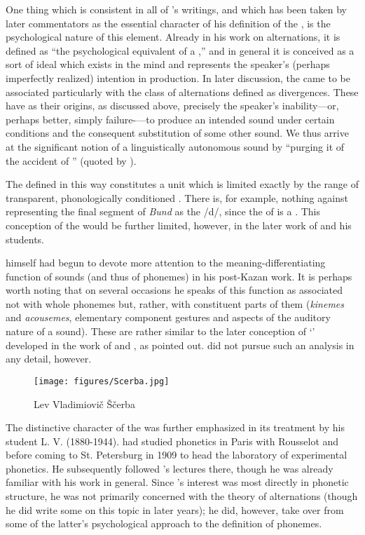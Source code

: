One thing which is consistent in all of {\Baudouin}'s writings, and which
has been taken by later commentators as the essential character of his
definition of the , is the psychological nature of this
element. Already in his work on alternations, it is defined as ``the
psychological equivalent of a ,'' and in general it is
conceived as a sort of ideal  which exists in the mind and
represents the speaker's (perhaps imperfectly realized) intention in
production. In later discussion, the  came to be associated
particularly with the class of alternations defined as
divergences. These have as their origins, as discussed above,
precisely the speaker's inability—or, perhaps better, simply
failure-—to produce an intended sound under certain conditions and the
consequent substitution of some other sound. We thus arrive at the
{significant} notion of a linguistically autonomous sound by ``purging it
of the accident of '' (quoted by
\citealt[25]{stankiewicz72:intro}).

The  defined in this way constitutes a unit which is limited
exactly by the range of transparent, phonologically conditioned
. There is, for example, nothing against representing the
final segment of  \emph{Bund} as the  /d/, since the
 of  is a . This conception of the
 would be further limited, however, in the later work of
{\Baudouin} and his students.

{\Baudouin} himself had begun to devote more attention to the
meaning-differen\-tia\-ting function of sounds (and thus of phonemes)
in his post-Kazan work. It is perhaps worth noting that on several
occasions he speaks of this function as associated not with whole
phonemes but, rather, with constituent parts of them (\emph{kinemes}
and \emph{acousemes}, elementary component gestures and aspects of the
auditory nature of a sound). These are rather similar to the later
conception of `' developed in the work of {\Jakobson}
and {\Trubetzkoy}, as \citet{Jakobson60:kazan.school} pointed
out. {\Baudouin} did not pursue such an analysis in any detail, however.

\begin{wrapfigure}{r}{.35\textwidth}
  \texttt{[image: figures/Scerba.jpg]}
  \caption{Lev Vladimiovič Ščerba}
  \label{fig:ch.kazan_scerba}
\end{wrapfigure}
The distinctive character of the  was further emphasized in its
treatment by his student L. V. {} (1880-1944). {} had studied
phonetics in Paris with Rousselot and {\Passy} before coming to
St. Petersburg in 1909 to head the laboratory of experimental
phonetics. He subsequently followed {\Baudouin}'s lectures there, though
he was already familiar with his work in general. Since {}'s
interest was most directly in phonetic structure, he was not primarily
concerned with the theory of alternations (though he did write some on
this topic in later years); he did, however, take over from {\Baudouin}
some of the latter's psychological approach to the definition of
phonemes.

